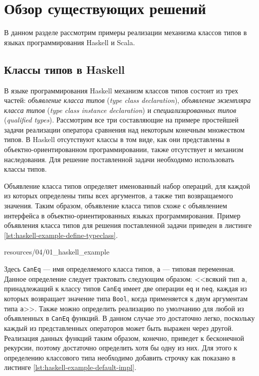 \chapter{Обзор существующих решений}

В данном разделе рассмотрим примеры реализации механизма классов типов в языках программирования Haskell и  Scala.

\section{Классы типов в Haskell \label{sct:overview-haskell}}

В языке программирования Haskell механизм классов типов состоит из трех частей: \emph{объявление класса типов} (\emph{type class declaration}), \emph{объявление экземпляра класса типов} (\emph{type class instance declaration}) и \emph{специализированных типов} (\emph{qualified types}). Рассмотрим все три составляющие на примере простейшей задачи реализации оператора сравнения над некоторым конечным множеством типов. В Haskell отсутствуют классы в том виде, как они представлены в объектно-ориентированном программировании, также отсутствует и механизм наследования. Для решение поставленной задачи необходимо использовать классы типов. 

Объявление класса типов определяет именованный набор операций, для каждой из которых определены типы всех аргументов, а также тип возвращаемого значения. Таким образом, объявление класса типов схоже с объявлением интерфейса в объектно-ориентированных языках программирования. Пример объявления класса типов для решения поставленной задачи приведен в листинге \ref{lst:haskell-example-define-typeclass}.    


{resources/04/01_haskell_example}

Здесь \lstinline{CanEq} --- имя определяемого класса типов, \lstinline{a} --- типовая переменная. Данное определение следует трактовать следующим образом: <<всякий тип \lstinline{a}, принадлежащий к классу типов \lstinline{CanEq} имеет две операции \lstinline{eq} и \lstinline{neq}, каждая из которых возвращает значение типа \lstinline{Bool}, когда применяется к двум аргументам типа \lstinline{a}>>. Также можно определить реализацию по умолчанию для любой из объявленных в \lstinline{CanEq} функций. В данном случае это достаточно легко, поскольку каждый из представленных операторов может быть выражен через другой. Реализация данных функций таким образом, конечно, приведет к бесконечной рекурсии, поэтому достаточно определить хотя бы одну из них. Для этого к определению классового типа необходимо добавить строчку как показано в листинге \ref{lst:haskell-example-default-impl}.

